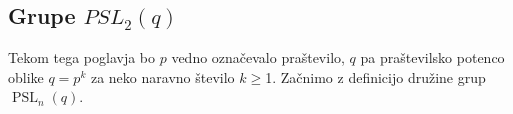 





\subsection{Grupe $PSL_2(q)$}\label{sec_grupe_psl2q}

Tekom tega poglavja bo $p$ vedno označevalo praštevilo, $q$ pa praštevilsko potenco oblike $q = p^{k}$ za neko naravno število $k \ge $1. Začnimo z definicijo družine grup $\operatorname{PSL}_n(q)$.

